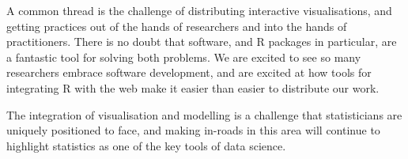 \documentclass[preprint]{imsart}
\begin{document}
A common thread is the challenge of distributing interactive visualisations, and getting practices out of the hands of researchers and into the hands of practitioners. There is no doubt that software, and R packages in particular, are a fantastic tool for solving both problems. We are excited to see so many researchers embrace software development, and are excited at how tools for integrating R with the web make it easier than easier to distribute our work.

The integration of visualisation and modelling is a challenge that statisticians are uniquely positioned to face, and making in-roads in this area will continue to highlight statistics as one of the key tools of data science.



\end{document}

